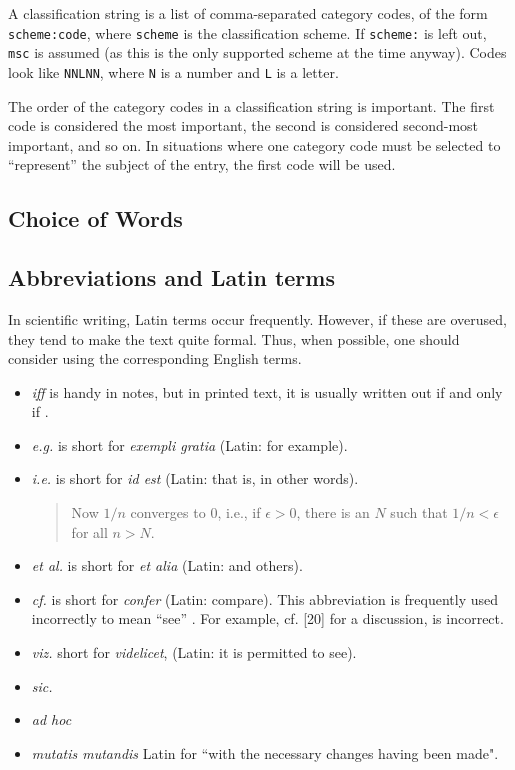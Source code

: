 A classification string is a list of comma-separated category codes, of the form \verb=scheme:code=, where \verb=scheme= is the classification scheme. If \verb=scheme:= is left out, \verb=msc= is assumed (as this is the only supported scheme at the time anyway). Codes look like \verb=NNLNN=, where \verb=N= is a number and \verb=L= is a letter.

The order of the category codes in a classification string is important. The first code is considered the most important, the second is considered second-most important, and so on. In situations where one category code must be selected to ``represent'' the subject of the entry, the first code will be used.


\subsection{Choice of Words}
\subsection{Abbreviations and Latin terms}
In scientific writing, Latin terms occur frequently. However, if these are overused,
they tend to make the text quite formal. Thus, when possible, one should consider
using the corresponding English terms.
\begin{itemize}
\item \emph{iff} is handy in notes, but in printed text, it is usually written out
if and only if \cite{higham}.
\item \emph{e.g.} is short for \emph{exempli gratia} (Latin: for example).
\item \emph{i.e.} is short for \emph{id est} (Latin: that is, in other words).
\begin{quote}
Now $1/n$ converges to $0$, i.e., if $\epsilon>0$, there is an $N$ such that
$1/n<\epsilon$ for all $n>N$.
\end{quote}
\item \emph{et al.} is short for \emph{et alia} (Latin: and others).
\item \emph{cf.} is short for \emph{confer} (Latin: compare). This abbreviation
is frequently used incorrectly to mean ``see'' \cite{higham}.
For example, cf. [20] for a discussion, is incorrect.
\item \emph{viz.} short for \emph{videlicet}, (Latin: it is permitted to see).
\item \emph{sic.}
\item \emph{ad hoc}
\item \emph{mutatis mutandis} Latin for ``with the necessary changes having
been made".
\end{itemize}

